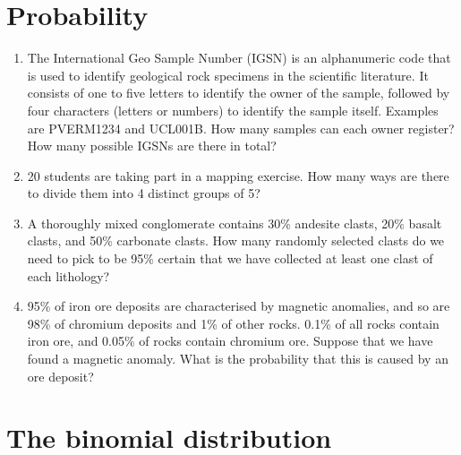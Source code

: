 \section{Probability}
\label{sec:ex-probability}

\begin{enumerate}
  
\item The International Geo Sample Number (IGSN) is an alphanumeric
  code that is used to identify geological rock specimens in the
  scientific literature. It consists of one to five letters to
  identify the owner of the sample, followed by four characters
  (letters or numbers) to identify the sample itself. Examples are
  PVERM1234 and UCL001B. How many samples can each owner register? How
  many possible IGSNs are there in total?

\item 20 students are taking part in a mapping exercise. How many ways
  are there to divide them into 4 distinct groups of 5?
  
\item A thoroughly mixed conglomerate contains 30\% andesite clasts,
  20\% basalt clasts, and 50\% carbonate clasts. How many randomly
  selected clasts do we need to pick to be 95\% certain that we have
  collected at least one clast of each lithology?

\item 95\% of iron ore deposits are characterised by magnetic
  anomalies, and so are 98\% of chromium deposits and 1\% of other
  rocks.  0.1\% of all rocks contain iron ore, and 0.05\% of rocks
  contain chromium ore. Suppose that we have found a magnetic anomaly.
  What is the probability that this is caused by an ore deposit?

\end{enumerate}
  
\section{The binomial distribution}
\label{sec:ex-binomial}


